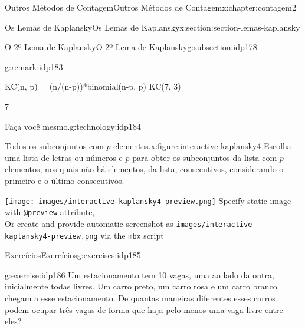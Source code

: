 \documentclass[oneside,10pt,]{book}
\newcommand{\mono}[1]{\texttt{#1}}
\numberwithin{equation}{section}
\newlength{\qrsize}
\newlength{\previewwidth}
\begin{document}
\begin{chapterptx}{Outros Métodos de Contagem}{}{Outros Métodos de Contagem}{}{}{x:chapter:contagem2}
\begin{sectionptx}{Os Lemas de Kaplansky}{}{Os Lemas de Kaplansky}{}{}{x:section:section-lemas-kaplansky}
\begin{subsectionptx}{O 2º Lema de Kaplansky}{}{O 2º Lema de Kaplansky}{}{}{g:subsection:idp178}
\begin{remark}{}{g:remark:idp183}
\begin{sageinput}
KC(n, p) = (n/(n-p))*binomial(n-p, p) 
KC(7, 3)
\end{sageinput}
\begin{sageoutput}
7
\end{sageoutput}
\end{remark}
\begin{technology}{Faça você mesmo.}{g:technology:idp184}%
\begin{figureptx}{Todos os subconjuntos com \(p\) elementos.}{x:figure:interactive-kaplansky4}{}%
\centering
Escolha uma lista de letras ou números e \(p\) para obter os subconjuntos da lista com \(p\) elementos, nos quais não há elementos, da lista, consecutivos, considerando o primeiro e o último consecutivos.%
\setlength{\qrsize}{9em}
\setlength{\previewwidth}{\linewidth}
\addtolength{\previewwidth}{-\qrsize}
\begin{tcbraster}[raster columns=2, raster column skip=1pt, raster halign=center, raster force size=false, raster left skip=0pt, raster right skip=0pt]%
\begin{tcolorbox}[previewstyle, width=\previewwidth]%
%
{\texttt{[image: images/interactive-kaplansky4-preview.png]}}%
{\small{}Specify static image with \mono{@preview} attribute,\\Or create and provide automatic screenshot as \mono{images/interactive-kaplansky4-preview.png} via the \mono{mbx} script}%
\end{tcolorbox}%
\begin{tcolorbox}[qrstyle]%
{\hypersetup{urlcolor=black}}%
\end{tcolorbox}%
\end{tcbraster}%
\tcblower
\end{figureptx}%
\end{technology}
\end{subsectionptx}
%
%
\typeout{************************************************}
\typeout{************************************************}
%
\begin{exercises-subsection}{Exercícios}{}{Exercícios}{}{}{g:exercises:idp185}
\begin{divisionexercise}{1}{}{}{g:exercise:idp186}%
Um estacionamento tem 10 vagas, uma ao lado da outra, inicialmente todas livres. Um carro preto, um carro rosa e um carro branco chegam a esse estacionamento. De quantas maneiras diferentes esses carros podem ocupar três vagas de forma que haja pelo menos uma vaga livre entre eles?%

\end{divisionexercise}
\end{exercises-subsection}
\end{sectionptx}
\end{chapterptx}
\end{document}
